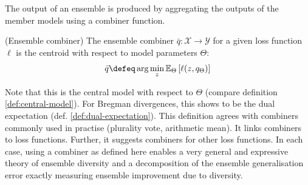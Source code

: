 \documentclass[
    a4paper, %
	fontsize=10pt, %
	twoside=false, %
]{kaobook}
\begin{document}
The output of an ensemble is produced by aggregating the outputs of the member models using a combiner function. 
\begin{definition} (Ensemble combiner) The ensemble combiner $\bar{q} : \mathcal{X} \to \mathcal{Y}$ for a given loss function $\ell$ is the centroid with respect to model parameters $\Theta$: 
$$
\bar{q} \defeq \arg\min_z \mathbb{E}_\Theta \left[ \ell(z, q_\Theta) \right]
$$
\end{definition}
Note that this is the central model with respect to $\Theta$ (compare definition \ref{def:central-model}).
For Bregman divergences, this shows to be the dual expectation (def. \ref{def:dual-expectation}). This definition agrees with combiners commonly used in practise (plurality vote, arithmetic mean). It links combiners to loss functions. Further, it suggests combiners for other loss functions. In each case, using a combiner as defined here enables a very general and expressive theory of ensemble diversity and a decomposition of the ensemble generalisation error exactly measuring ensemble improvement due to diversity.
\end{document}
